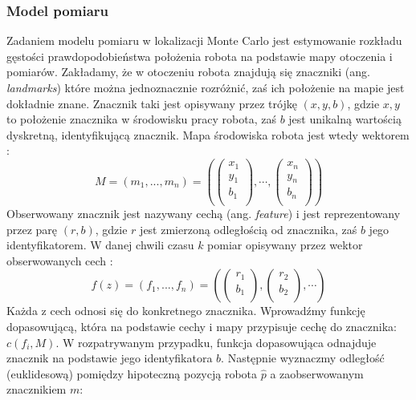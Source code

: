\subsubsection{Model pomiaru}
Zadaniem modelu pomiaru w lokalizacji Monte Carlo jest estymowanie rozkładu gęstości prawdopodobieństwa położenia robota na podstawie mapy otoczenia i pomiarów. Zakładamy, że w otoczeniu robota znajdują się znaczniki (ang. \textit{landmarks}) które można jednoznacznie rozróżnić, zaś ich położenie na mapie jest dokładnie znane. Znacznik taki jest opisywany przez trójkę $(x, y, b)$, gdzie $x, y$ to położenie znacznika w środowisku pracy robota, zaś $b$ jest unikalną wartością dyskretną, identyfikującą znacznik. Mapa środowiska robota jest wtedy wektorem \cite{landmarks}:
\begin{equation}
 M = (m_1,  ..., m_n) = \left( 
  \left( \begin{array}{c} 
x_1 \\
y_1 \\
b_1 \\
\end{array} \right),
\cdots,
  \left( \begin{array}{c} 
x_n \\
y_n \\
b_n \\
\end{array} \right)
\right)
\end{equation}
Obserwowany znacznik jest nazywany cechą (ang. \textit{feature}) i jest reprezentowany przez parę $(r, b)$, gdzie $r$ jest zmierzoną odległością od znacznika, zaś $b$ jego identyfikatorem. W danej chwili czasu $k$ pomiar opisywany przez wektor obserwowanych cech \cite{landmarks}:
\begin{equation}
 f(z) = (f_1,  ..., f_n) = \left( 
  \left( \begin{array}{c} 
r_1 \\
b_1 \\
\end{array} \right),
  \left( \begin{array}{c} 
r_2 \\
b_2 \\
\end{array} \right),
\cdots
\right)
\end{equation}
Każda z cech odnosi się do konkretnego znacznika. Wprowadźmy funkcję dopasowującą, która na podstawie cechy i mapy przypisuje cechę do znacznika: $c(f_i, M)$. W rozpatrywanym przypadku, funkcja dopasowująca odnajduje znacznik na podstawie jego identyfikatora $b$. Następnie wyznaczmy odległość (euklidesową) pomiędzy hipoteczną pozycją robota $\hat p$ a zaobserwowanym znacznikiem $m$:
